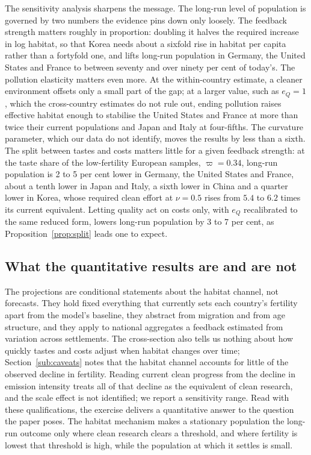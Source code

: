 \documentclass[11pt]{article}
\begin{document}
The sensitivity analysis sharpens the message. The long-run level of population is governed by two
numbers the evidence pins down only loosely. The feedback strength matters roughly in proportion: doubling
it halves the required increase in log habitat, so that Korea needs about a sixfold rise in habitat per
capita rather than a fortyfold one, and lifts long-run population in Germany, the United States and France to
between seventy and over ninety per cent of today's. The pollution elasticity matters even more. At the
within-country estimate, a cleaner environment offsets only a small part of the gap; at a larger value,
such as $e_Q=1$, which the cross-country estimates do not rule out, ending pollution raises effective habitat enough to stabilise the United States and France at
more than twice their current populations and Japan and Italy at four-fifths. The curvature parameter,
which our data do not identify, moves the results by less than a sixth. The split between tastes and
costs matters little for a given feedback strength: at the taste share of the low-fertility European
samples, $\varpi=0.34$, long-run population is 2 to 5 per cent lower in Germany, the United States
and France, about a tenth lower in Japan and Italy, a sixth lower in China and a quarter lower in
Korea, whose required clean effort at $\nu=0.5$ rises from $5.4$ to $6.2$ times its current
equivalent. Letting quality act on costs only,
with $e_Q$ recalibrated to the same reduced form, lowers long-run population by 3 to 7 per cent, as
Proposition~\ref{prop:split} leads one to expect.

\subsection{What the quantitative results are and are not}
The projections are conditional statements about the habitat channel, not forecasts. They hold fixed
everything that currently sets each country's fertility apart from the model's baseline, they abstract
from migration and from age structure, and they apply to national aggregates a feedback estimated from
variation across settlements. The cross-section also tells us nothing about how quickly tastes and costs
adjust when habitat changes over time; Section~\ref{sub:caveats} notes that the habitat channel accounts
for little of the observed decline in fertility. Reading current clean progress from the decline in emission
intensity treats all of that decline as the equivalent of clean research, and the scale effect is not
identified; we report a sensitivity range. Read with these qualifications, the exercise delivers a quantitative answer to the question
the paper poses. The habitat mechanism makes a stationary population the long-run outcome only where
clean research clears a threshold, and where fertility is lowest that threshold is high, while the
population at which it settles is small.
\end{document}
